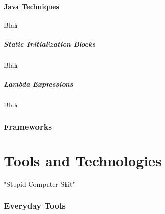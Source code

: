 
\subsection{Java Techniques}

Blah

\subsubsection{Static Initialization Blocks}

Blah

\subsubsection{Lambda Expressions}


Blah \\


\toclineskip
\section{Frameworks}

\newpage


\part*{Tools and Technologies}

"Stupid Computer Shit"


\toclineskip
\section{Everyday Tools}

